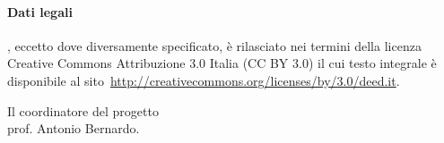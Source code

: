 \paragraph{Dati legali} \serie, eccetto dove diversamente specificato, è rilasciato nei termini 
della licenza Creative Commons Attribuzione 3.0 Italia
(CC BY 3.0) il cui testo integrale è disponibile al 
sito~\url{http://creativecommons.org/licenses/by/3.0/deed.it}.


\begin{flushright}
Il coordinatore del progetto\\
prof. Antonio Bernardo.
\end{flushright}

\cleardoublepage
